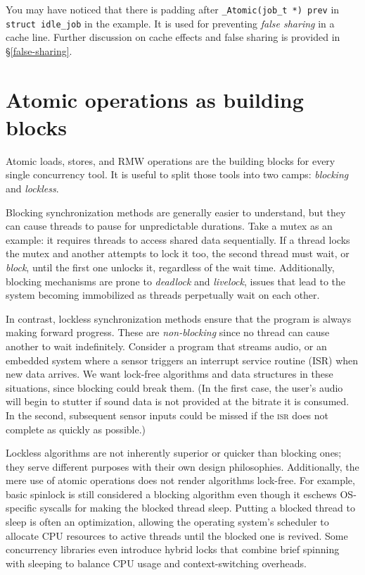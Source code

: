 \documentclass[fontsize=10pt, oneside]{scrartcl}
\newcommand{\monobox}[1]{\mbox{\texttt{#1}}}
\newcommand{\introduce}[1]{\textit{#1}}
\newcommand{\secref}[1]{\hyperref[#1]{\textsc{\S}\ref*{#1}}}
\begin{document}
You may have noticed that there is padding after \monobox{\_Atomic(job\_t *) prev} in \monobox{struct idle\_job} in the example.
It is used for preventing \introduce{false sharing} in a cache line.
Further discussion on cache effects and false sharing is provided in \secref{false-sharing}.

\section{Atomic operations as building blocks}

Atomic loads, stores, and \textsc{RMW} operations are the building blocks for every single concurrency tool.
It is useful to split those tools into two camps:
\introduce{blocking} and \introduce{lockless}.

Blocking synchronization methods are generally easier to understand,
but they can cause threads to pause for unpredictable durations.
Take a mutex as an example:
it requires threads to access shared data sequentially.
If a thread locks the mutex and another attempts to lock it too,
the second thread must wait, or \introduce{block},
until the first one unlocks it, regardless of the wait time.
Additionally, blocking mechanisms are prone to \introduce{deadlock} and \introduce{livelock},
issues that lead to the system becoming immobilized as threads perpetually wait on each other.

In contrast, lockless synchronization methods ensure that the program is always making forward progress.
These are \introduce{non-blocking} since no thread can cause another to wait indefinitely.
Consider a program that streams audio,
or an embedded system where a sensor triggers an interrupt service routine (\textsc{ISR}) when new data arrives.
We want lock-free algorithms and data structures in these situations,
since blocking could break them.
(In the first case, the user's audio will begin to stutter if sound data is not provided at the bitrate it is consumed.
In the second, subsequent sensor inputs could be missed if the \textsc{isr} does not complete as quickly as possible.)

\setcounter{footnote}{0}
Lockless algorithms are not inherently superior or quicker than blocking ones;
they serve different purposes with their own design philosophies.
Additionally, the mere use of atomic operations does not render algorithms lock-free.
For example, basic spinlock is still considered a blocking algorithm even though it eschews \textsc{OS}-specific syscalls for making the blocked thread sleep.
Putting a blocked thread to sleep is often an optimization,
allowing the operating system's scheduler to allocate \textsc{CPU} resources to active threads until the blocked one is revived.
Some concurrency libraries even introduce hybrid locks that combine brief spinning with sleeping to balance \textsc{CPU} usage and context-switching overheads.
\end{document}
